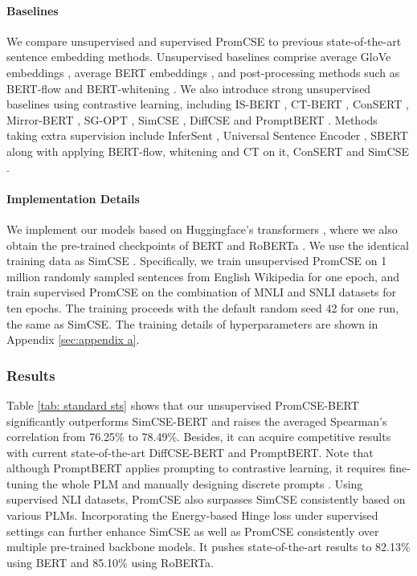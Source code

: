\documentclass[11pt]{article}
\begin{document}
\paragraph{Baselines}
We compare unsupervised and supervised PromCSE to previous state-of-the-art sentence embedding methods. Unsupervised baselines comprise average GloVe embeddings \cite{glove}, average BERT embeddings \cite{gao2021simcse}, and post-processing methods such as BERT-flow \cite{li20bertflow} and BERT-whitening \cite{su2021whitening}. We also introduce strong unsupervised baselines using contrastive learning, including IS-BERT \cite{zhang-etal-2020-isbert}, CT-BERT \cite{carlsson2020ctbert}, ConSERT \cite{Yan2021consert}, Mirror-BERT \cite{liu2021mirrorbert}, SG-OPT \cite{kim2021sgopt}, SimCSE \cite{gao2021simcse}, DiffCSE \cite{chuang2022diffcse} and PromptBERT \cite{2022promptbert}. 
Methods taking extra supervision include InferSent \cite{ConneauKSBB17USE}, Universal Sentence Encoder \cite{CerYKHLJCGYTSK18}, SBERT \cite{ReimersG19sbert} along with applying BERT-flow, whitening and CT on it, ConSERT \cite{Yan2021consert} and SimCSE \cite{gao2021simcse}.
\paragraph{Implementation Details}
We implement our models based on Huggingface’s transformers \cite{huggingface}, where we also obtain the pre-trained checkpoints of BERT \cite{devlin2019bert} and RoBERTa \cite{liu2019roberta}.
We use the identical training data as SimCSE \cite{gao2021simcse}. Specifically, we train unsupervised PromCSE on 1 million randomly sampled sentences from English Wikipedia for one epoch, and train supervised PromCSE on the combination of MNLI \cite{mnli} and SNLI \cite{snli} datasets for ten epochs.
The training proceeds with the default random seed 42 for one run, the same as SimCSE. The training details of hyperparameters are shown in Appendix \ref{sec:appendix a}.


\subsubsection{Results}
Table \ref{tab: standard sts} shows that our unsupervised PromCSE-BERT significantly outperforms SimCSE-BERT and raises the averaged Spearman’s correlation from 76.25\% to 78.49\%. Besides, it can acquire competitive results with current state-of-the-art DiffCSE-BERT and PromptBERT. Note that although PromptBERT applies prompting to contrastive learning, it requires fine-tuning the whole PLM and manually designing discrete prompts \cite{2022promptbert}. 
Using supervised NLI datasets, PromCSE also surpasses SimCSE consistently based on various PLMs.
Incorporating the Energy-based Hinge loss under supervised settings can further enhance SimCSE as well as PromCSE consistently over multiple pre-trained backbone models. It pushes state-of-the-art results to 82.13\% using BERT and 85.10\% using RoBERTa.
\end{document}
